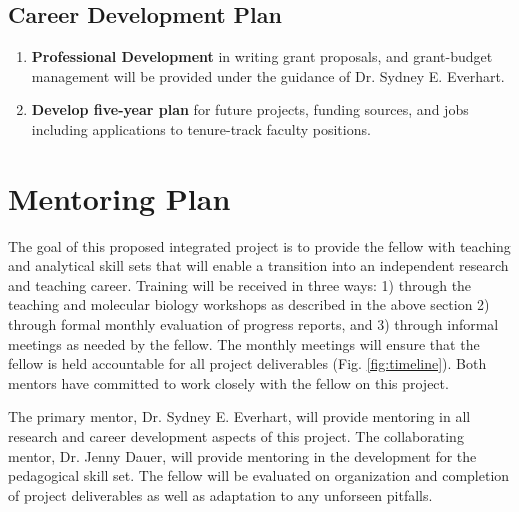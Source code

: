 \documentclass[12pt,letterpaper]{article}
\begin{document}
\subsection{Career Development Plan}

\begin{enumerate}
  \item \textbf{Professional Development} in writing grant proposals, and grant-budget management will be provided under the guidance of Dr. Sydney E. Everhart.
  \item \textbf{Develop five-year plan} for future projects, funding sources, and jobs including applications to tenure-track faculty positions.  
\end{enumerate}



\section{Mentoring Plan}

The goal of this proposed integrated project is to provide the fellow with teaching and analytical skill sets that will enable a transition into an independent research and teaching career. 
Training will be received in three ways: 1) through the teaching and molecular biology workshops as described in the above section 2) through formal monthly evaluation of progress reports, and 3) through informal meetings as needed by the fellow. 
The monthly meetings will ensure that the fellow is held accountable for all project deliverables (Fig. \ref{fig:timeline}). 
Both mentors have committed to work closely with the fellow on this project.

The primary mentor, Dr. Sydney E. Everhart, will provide mentoring in all research and career development aspects of this project.
The collaborating mentor, Dr. Jenny Dauer, will provide mentoring in the development for the pedagogical skill set.
The fellow will be evaluated on organization and completion of project deliverables as well as adaptation to any unforseen pitfalls. 



\end{document}
